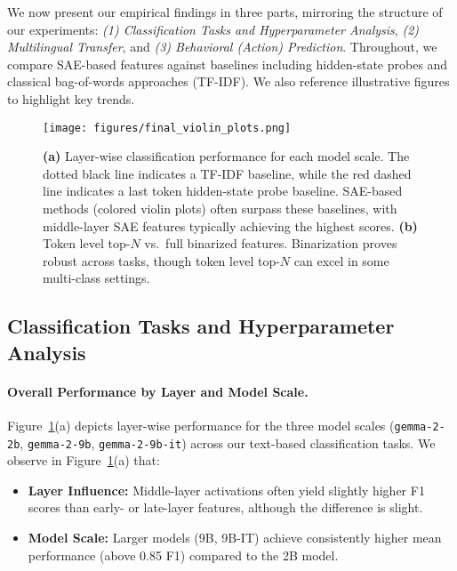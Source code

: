 We now present our empirical findings in three parts, mirroring the structure of our experiments: \emph{(1) Classification Tasks and Hyperparameter Analysis}, \emph{(2) Multilingual Transfer}, and \emph{(3) Behavioral (Action) Prediction}. Throughout, we compare SAE-based features against baselines including hidden-state probes and classical bag-of-words approaches (TF-IDF). We also reference illustrative figures to highlight key trends.

\begin{figure}[t]
    \centering
    \texttt{[image: figures/final\_violin\_plots.png]}
    \caption{\textbf{(a)} Layer-wise classification performance for each model scale. The dotted black line indicates a TF-IDF baseline, while the red dashed line indicates a last token hidden-state probe baseline. SAE-based methods (colored violin plots) often surpass these baselines, with middle-layer SAE features typically achieving the highest scores. \textbf{(b)} Token level top-$N$ vs.\ full binarized features. Binarization proves robust across tasks, though token level top-$N$ can excel in some multi-class settings.}
    \label{fig:pooling} 
\end{figure}

\subsection{Classification Tasks and Hyperparameter Analysis}
\label{sec:classification_results}

\paragraph{Overall Performance by Layer and Model Scale.}
Figure~\ref{fig:pooling}(a) depicts layer-wise performance for the three model scales (\texttt{gemma-2-2b}, \texttt{gemma-2-9b}, \texttt{gemma-2-9b-it}) across our text-based classification tasks. 
We observe in Figure~\ref{fig:pooling}(a) that:
\begin{itemize}
    \item \textbf{Layer Influence:} Middle-layer activations often yield slightly higher F1 scores than early- or late-layer features, although the difference is slight.
    \item \textbf{Model Scale:} Larger models (9B, 9B-IT) achieve consistently higher mean performance (above 0.85 F1) compared to the 2B model.
\end{itemize}


